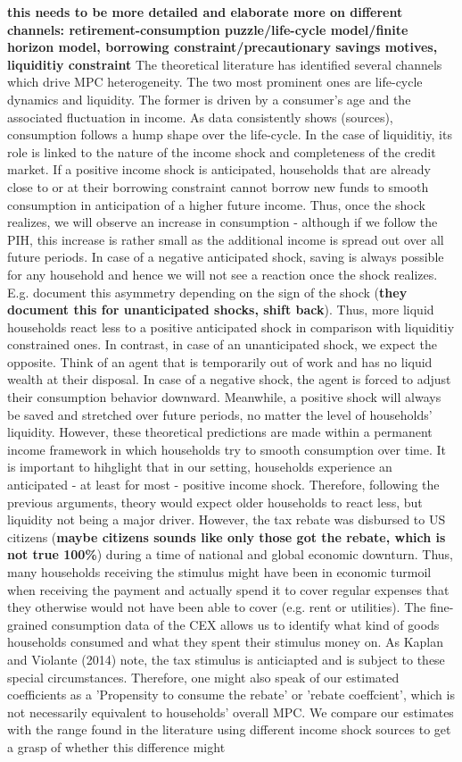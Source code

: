 \textbf{this needs to be more detailed and elaborate more on different channels: retirement-consumption puzzle/life-cycle model/finite horizon model, borrowing constraint/precautionary savings motives, liquiditiy constraint}
The theoretical literature has identified several channels which drive MPC heterogeneity. The two most prominent ones are life-cycle dynamics and liquidity. The former is driven by a consumer's age and the associated fluctuation in income. As data consistently shows (sources), consumption follows a hump shape over the life-cycle. In the case of liquiditiy, its role is linked to the nature of the income shock and completeness of the credit market. If a positive income shock is anticipated, households that are already close to or at their borrowing constraint cannot borrow new funds to smooth consumption in anticipation of a higher future income. Thus, once the shock realizes, we will observe an increase in consumption - although if we follow the PIH, this increase is rather small as the additional income is spread out over all future periods. In case of a negative anticipated shock, saving is always possible for any household and hence we will not see a reaction once the shock realizes. E.g. \cite{bunn_etal} document this asymmetry depending on the sign of the shock (\textbf{they document this for unanticipated shocks, shift back}). Thus, more liquid households react less to a positive anticipated shock in comparison with liquiditiy constrained ones. In contrast, in case of an unanticipated shock, we expect the opposite. Think of an agent that is temporarily out of work and has no liquid wealth at their disposal. In case of a negative shock, the agent is forced to adjust their consumption behavior downward. Meanwhile, a positive shock will always be saved and stretched over future periods, no matter the level of households' liquidity. However, these theoretical predictions are made within a permanent income framework in which households try to smooth consumption over time. It is important to hihglight that in our setting, households experience an anticipated - at least for most - positive income shock. Therefore, following the previous arguments, theory would expect older households to react less, but liquidity not being a major driver. However, the tax rebate was disbursed to US citizens (\textbf{maybe citizens sounds like only those got the rebate, which is not true 100\%}) during a time of national and global economic downturn. Thus, many households receiving the stimulus might have been in economic turmoil when receiving the payment and actually spend it to cover regular expenses that they otherwise would not have been able to cover (e.g. rent or utilities). The fine-grained consumption data of the CEX allows us to identify what kind of goods households consumed and what they spent their stimulus money on. As Kaplan and Violante (2014) note, the tax stimulus is anticiapted and is subject to these special circumstances. Therefore, one might also speak of our estimated coefficients as a 'Propensity to consume the rebate' or 'rebate coeffcient', which is not necessarily equivalent to households' overall MPC. We compare our estimates with the range found in the literature using different income shock sources to get a grasp of whether this difference might 